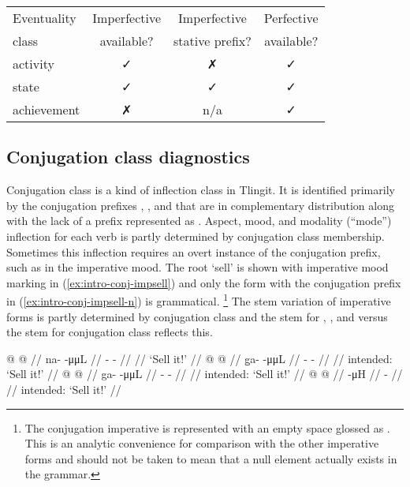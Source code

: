 \documentclass[12pt,letterpaper,oneside,article]{memoir}
\begin{document}
\ex\label{ex:intro-asp-distribution}%
\begin{tabular}[t]{lccc}
Eventuality	& Imperfective	& Imperfective 		& Perfective\\
class		& available?	& stative prefix?	& available?\\
\midrule
activity	& ✓		& ✗			& ✓\\
state		& ✓		& ✓			& ✓\\
achievement	& ✗		& n/a			& ✓\\
\end{tabular}
\xe


\subsection{Conjugation class diagnostics}\label{sec:intro-conj}

Conjugation class is a kind of inflection class in Tlingit.
It is identified primarily by the conjugation prefixes , , and  that are in complementary distribution along with the lack of a prefix represented as  \parencite[577–580]{crippen:2019}.
Aspect, mood, and modality (“mode”) inflection for each verb is partly determined by conjugation class membership.
Sometimes this inflection requires an overt instance of the conjugation prefix, such as in the imperative mood.
The root  ‘sell’ is shown with imperative mood marking in (\ref{ex:intro-conj-impsell}) and only the form with the  conjugation prefix in (\ref{ex:intro-conj-impsell-n}) is grammatical.%
\footnote{The  conjugation imperative is represented with an empty space glossed as .
This is an analytic convenience for comparison with the other imperative forms and should not be taken to mean that a null element actually exists in the grammar.}
The stem variation of imperative forms is partly determined by conjugation class and the  stem for , , and  versus the  stem for  conjugation class reflects this.

\pex\label{ex:intro-conj-impsell}%
\a\label{ex:intro-conj-impsell-n}%
%
\begingl
	\gla	{} @ {} @ {} //
	\glb	na-  -μμL //
	\glc	{}-  - //
	\gld	{} {} {} //
	\glft	‘Sell it!’
		//
\endgl
\a\label{ex:intro-conj-impsell-gh}%
\ljudge{*}%
%
\begingl
	\gla	{} @ {} @ {} //
	\glb	g̱a-  -μμL //
	\glc	{}-  - //
	\gld	{} {} {} //
	\glft	intended: ‘Sell it!’
		//
\endgl
\a\label{ex:intro-conj-impsell-g}%
\ljudge{*}%
%
\begingl
	\gla	{} @ {} @ {} //
	\glb	ga-  -μμL //
	\glc	{}-  - //
	\gld	{} {} {} //
	\glft	intended: ‘Sell it!’
		//
\endgl
\a\label{ex:intro-conj-impsell-z}%
\ljudge{*}%
%
\begingl
	\gla	{} @ {} @ {} //
	\glb	{}  -μH //
	\glc	{}\·  - //
	\gld	{} {} {} //
	\glft	intended: ‘Sell it!’
		//
\endgl
\xe
\end{document}
